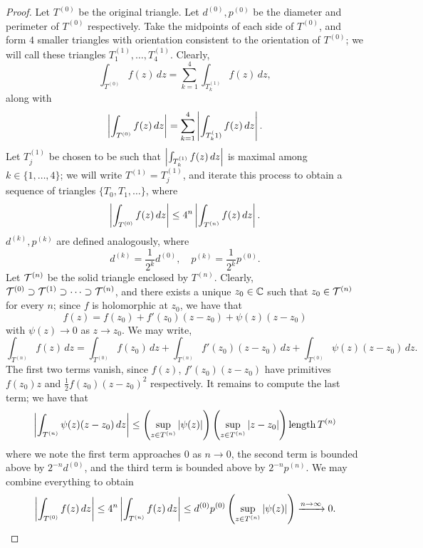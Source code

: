 \begin{proof}
    Let $T^{(0)}$ be the original triangle. Let $d^{(0)}, p^{(0)}$ be the diameter and perimeter of $T^{(0)}$ respectively. Take the midpoints of each side of $T^{(0)}$, and form $4$ smaller triangles with orientation consistent to the orientation of $T^{(0)}$; we will call these triangles $T_1^{(1)}, \dots, T_4^{(1)}$. Clearly,
    \[ \int_{T^{(0)}} f(z) \, dz = \sum_{k=1}^4 \int_{T_k^(1)} f(z) \, dz, \]
    along with
    \[ \left\lvert \int_{T^{(0)}} f(z) \, dz \right\rvert = \sum_{k=1}^4 \left\lvert \int_{T_k^(1)} f(z) \, dz \right\rvert. \]
    Let $T_j^{(1)}$ be chosen to be such that $\left\lvert \int_{T_k^{(1)}} f(z) \, dz \right\rvert$ is maximal among $k \in \{1, \dots, 4\}$; we will write $T^{(1)} = T_j^{(1)}$, and iterate this process to obtain a sequence of triangles $\{T_0, T_1, \dots\}$, where
    \[ \left\lvert \int_{T^{(0)}} f(z) \, dz \right\rvert \leq 4^n \left\lvert \int_{T^{(n)}} f(z) \, dz \right\rvert. \]
    $d^{(k)}, p^{(k)}$ are defined analogously, where
    \[ d^{(k)} = \frac{1}{2^k} d^{(0)}, \quad p^{(k)} = \frac{1}{2^k} p^{(0)}. \]
    Let $\mathcal T^{(n)}$ be the solid triangle enclosed by $T^{(n)}$. Clearly, $\mathcal T^{(0)} \supset \mathcal T^{(1)} \supset \dots \supset \mathcal T^{(n)}$, and there exists a unique $z_0 \in \mathbb C$ such that $z_0 \in \mathcal T^{(n)}$ for every $n$; since $f$ is holomorphic at $z_0$, we have that
    \[ f(z) = f(z_0) + f'(z_0)(z - z_0) + \psi(z)(z - z_0) \]
    with $\psi(z) \to 0$ as $z \to z_0$. We may write,
    \[ \int_{T^{(n)}} f(z) \, dz = \int_{T^{(0)}} f(z_0) \, dz + \int_{T^{(n)}} f'(z_0) (z - z_0) \, dz + \int_{T^{(0)}} \psi(z) (z - z_0) \, dz. \]
    The first two terms vanish, since $f(z)$, $f'(z_0)(z - z_0)$ have primitives $f(z_0) z$ and $\frac{1}{2} f(z_0) (z - z_0)^2$ respectively. It remains to compute the last term; we have that
    \[ \left\lvert \int_{T^{(n)}} \psi(z) (z - z_0) \, dz \right\rvert \leq \left(\sup_{z \in T^{(n)}} \left\lvert \psi(z) \right\rvert\right) \left(\sup_{z \in T^{(n)}} \left\lvert z - z_0 \right\rvert\right) \operatorname{length} T^{(n)} \]
    where we note the first term approaches $0$ as $n \to 0$, the second term is bounded above by $2^{-n} d^{(0)}$, and the third term is bounded above by $2^{-n} p^{(n)}$. We may combine everything to obtain
    \[ \left\lvert \int_{T^{(0)}} f(z) \, dz \right\rvert \leq 4^n \left\lvert \int_{T^{(n)}} f(z) \, dz \right\rvert \leq d^{(0)} p^{(0)} \left(\sup_{z \in T^{(n)}} \left\lvert \psi(z) \right\rvert\right) \xrightarrow{n \to \infty} 0. \qedhere \]
\end{proof}